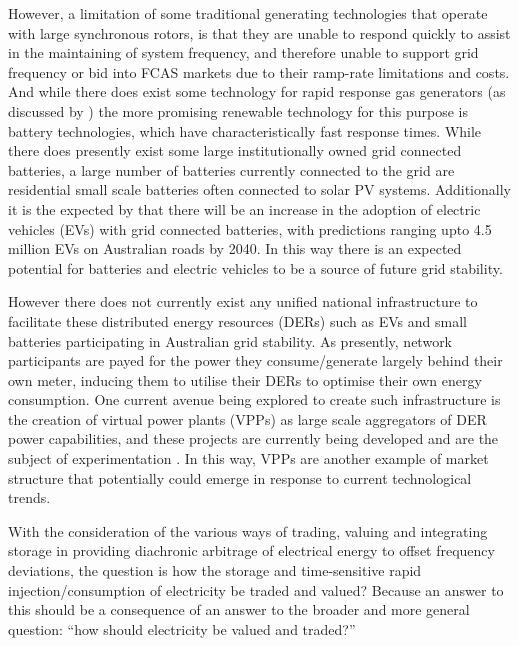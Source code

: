 However, a limitation of some traditional generating technologies that operate with large synchronous rotors, is that they are unable to respond quickly to assist in the maintaining of system frequency, and therefore unable to support grid frequency or bid into FCAS markets due to their ramp-rate limitations and costs. \citep{GONZALEZSALAZAR20181497}
And while there does exist some technology for rapid response gas generators (as discussed by \cite{GONZALEZSALAZAR20181497}) the more promising renewable technology for this purpose is battery technologies, which have characteristically fast response times.
While there does presently exist some large institutionally owned grid connected batteries, a large number of batteries currently connected to the grid are residential small scale batteries often connected to solar PV systems.
Additionally it is the expected by \cite{australianenergymarketoperatorlimited2019} that there will be an increase in the adoption of electric vehicles (EVs) with grid connected batteries, with predictions ranging upto 4.5 million EVs on Australian roads by 2040.
In this way there is an expected potential for batteries and electric vehicles to be a source of future grid stability.

However there does not currently exist any unified national infrastructure to facilitate these distributed energy resources (DERs) such as EVs and small batteries participating in Australian grid stability.
As presently, network participants are payed for the power they consume/generate largely behind their own meter, inducing them to utilise their DERs to optimise their own energy consumption.
One current avenue being explored to create such infrastructure is the creation of virtual power plants (VPPs) as large scale aggregators of DER power capabilities, and these projects are currently being developed and are the subject of experimentation \citep{australianenergymarketoperatorlimited20188}.
In this way, VPPs are another example of market structure that potentially could emerge in response to current technological trends.


With the consideration of the various ways of trading, valuing and integrating storage in providing diachronic arbitrage of electrical energy to offset frequency deviations, the question is how the storage and time-sensitive rapid injection/consumption of electricity be traded and valued? Because an answer to this should be a consequence of an answer to the broader and more general question: ``how should electricity be valued and traded?''


